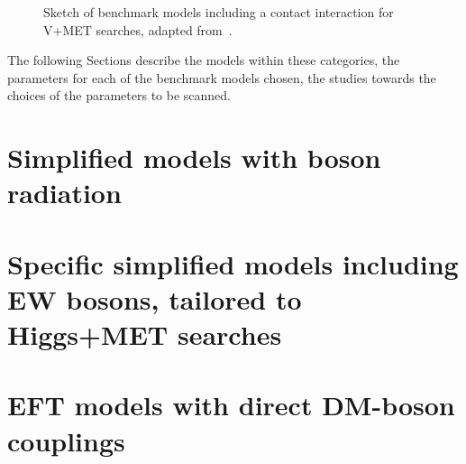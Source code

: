 \begin{figure}[h!]
	\centering
	\vspace{\baselineskip}
	\textwidth
	\begin{feynmandiagram}[modelVeft5pt]
	\end{feynmandiagram}
	
	\vspace{\baselineskip}
	\caption{Sketch of benchmark models including a contact interaction
		for V+MET searches, adapted from~\cite{Nelson:2013pqa}. \label{fig:VPlusMET_EFT}}
\end{figure}

The following Sections describe the models within these categories,
the parameters for each of the benchmark models chosen,
the studies towards the choices of the parameters to be scanned.

\section{Simplified models with boson radiation} \label{sec:bosonrad}


\section{Specific simplified models including EW bosons, tailored to Higgs+MET searches}


\section{EFT models with direct DM-boson couplings}
\label{sec:EFT_models_with_direct_DM_boson_couplings}


